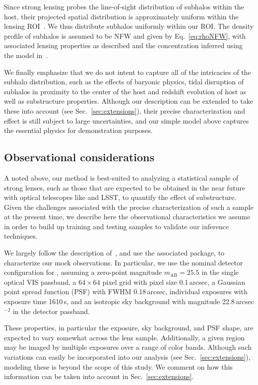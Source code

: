 \documentclass[twocolumn]{aastex62}
\begin{document}
Since strong lensing probes the line-of-sight distribution of subhalos within the host, their projected spatial distribution is approximately uniform within the lensing ROI~\citep{2017MNRAS.469.1997D}. We thus distribute subhalos uniformly within our ROI. The density profile of subhalos is assumed to be NFW and given by Eq.~\eqref{eq:rhoNFW}, with associated lensing properties as described and the concentration inferred using the model in~\citet{2014MNRAS.442.2271S}.

We finally emphasize that we do not intent to capture all of the intricacies of the subhalo distribution, such as the effects of baryonic physics, tidal disruption of subhalos in proximity to the center of the host and redshift evolution of host as well as substructure properties. Although our description can be extended to take these into account (see Sec.~\ref{sec:extensions}), their precise characterization and effect is still subject to large uncertainties, and our simple model above captures the essential physics for demonstration purposes.

\subsection{Observational considerations}
\label{sec:observations}

A noted above, our method is best-suited to analyzing a statistical sample of strong lenses, such as those that are expected to be obtained in the near future with optical telescopes like \Euclid and LSST, to quantify the effect of substructure. Given the challenges associated with the precise characterization of such a sample at the present time, we describe here the observational characteristics we assume in order to build up training and testing samples to validate our inference techniques.

We largely follow the description of~\citet{2015ApJ...811...20C}, and use the associated  package, to characterize our mock observations. In particular, we use the nominal detector configuration for \Euclid, assuming a zero-point magnitude $m_\mathrm{AB} = 25.5$ in the single optical VIS passband, a $64\times64$ pixel grid with pixel size 0.1\,arcsec, a Gaussian point spread function (PSF) with FWHM 0.18\,arcsec, individual exposures with exposure time 1610\,s, and an isotropic sky background with magnitude 22.8\,arcsec$^{-2}$ in the detector passband.

These properties, in particular the exposure, sky background, and PSF shape, are expected to vary somewhat across the lens sample. Additionally, a given region may be imaged by multiple exposures over a range of color bands. Although such variations can easily be incorporated into our analysis (see Sec.~\ref{sec:extensions}), modeling these is beyond the scope of this study. We comment on how this information can be taken into account in Sec.~\ref{sec:extensions}.
\end{document}
